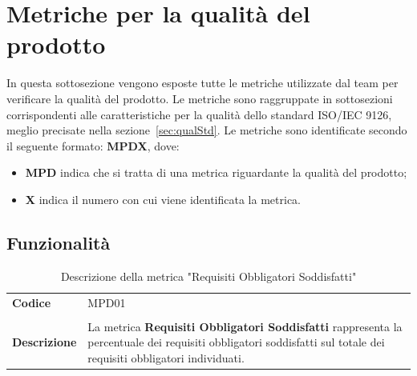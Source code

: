 \documentclass[a4paper,12pt]{article}
\begin{document}
\newpage

\section{Metriche per la qualità del prodotto}
\label{sec:mpd}
    In questa sottosezione vengono esposte tutte le metriche utilizzate dal team per verificare la qualità del prodotto. Le metriche sono raggruppate in sottosezioni corrispondenti alle caratteristiche per la qualità dello standard ISO/IEC 9126, meglio precisate nella sezione~\ref{sec:qualStd}.
    \newline
    \newline
    Le metriche sono identificate secondo il seguente formato: \textbf{MPDX}, dove:
    \begin{itemize}
        \item \textbf{MPD} indica che si tratta di una metrica riguardante la qualità del prodotto;
        \item \textbf{X} indica il numero con cui viene identificata la metrica.
    \end{itemize}

    \subsection{Funzionalità}
        {\renewcommand{\arraystretch}{1.4}
            \begin{table}[H]
            \centering
            \begin{tabularx}{\textwidth}{|l|X|}
                \hline
                \rowcolor{gold}
                \multicolumn{2}{|c|}{\textbf{Requisiti Obbligatori Soddisfatti}}\\
                \hline
                \textbf{Codice} & MPD01 \\
                \hline
                \raisebox{0.6\height}{\textbf{Formula}} &  \rule{0pt}{5ex}\raisebox{0.3\height}{\( \displaystyle \text{Requisiti Obbligatori Soddisfatti} = \frac{\text{Requisiti obbligatori soddisfatti}}{\text{Requisiti obbligatori totali}}*100 \)}\\
                \hline
                \textbf{Descrizione} & La metrica \textbf{Requisiti Obbligatori Soddisfatti} rappresenta la percentuale dei requisiti obbligatori soddisfatti sul totale dei requisiti obbligatori individuati.\\
                \hline
            \end{tabularx}      
            \caption{Descrizione della metrica "Requisiti Obbligatori Soddisfatti"}
            \end{table}
        }
\end{document}
